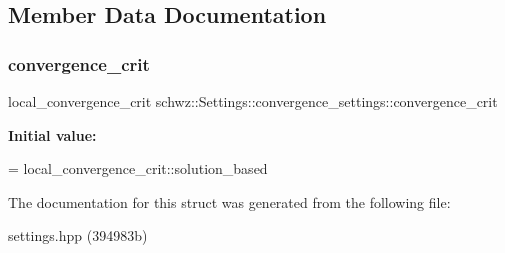 \subsection{Member Data Documentation}
\mbox{\label{structschwz_1_1Settings_1_1convergence__settings_a509f2b6af29a7afeafda9d45f8e12623}} 
\subsubsection{\texorpdfstring{convergence\+\_\+crit}{convergence\_crit}}
{\footnotesize\ttfamily local\+\_\+convergence\+\_\+crit schwz\+::\+Settings\+::convergence\+\_\+settings\+::convergence\+\_\+crit}

{\bfseries Initial value\+:}
\begin{DoxyCode}
=
            local\_convergence\_crit::solution\_based
\end{DoxyCode}


The documentation for this struct was generated from the following file\+:\begin{DoxyCompactItemize}
\item 
settings.\+hpp (394983b)\end{DoxyCompactItemize}
